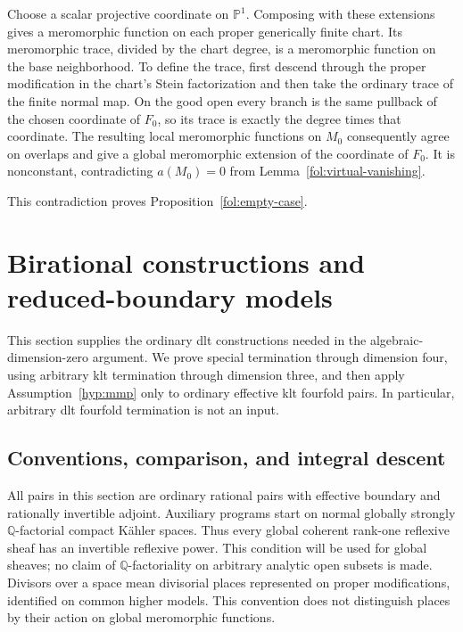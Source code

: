 \documentclass[11pt,letterpaper]{article}
\newcommand{\Q}{\mathbb{Q}}
\newcommand{\PP}{\mathbb{P}}
\theoremstyle{definition}
\theoremstyle{remark}
\begin{document}
Choose a scalar projective coordinate on $\PP^1$.  Composing with
these extensions gives a meromorphic function on each proper
generically finite chart.  Its meromorphic trace, divided by the
chart degree, is a meromorphic function on the base neighborhood.
To define the trace, first descend through the proper modification
in the chart's Stein factorization and then take the ordinary trace
of the finite normal map.  On the good open every branch is the
same pullback of the chosen coordinate of $F_0$, so its trace is
exactly the degree times that coordinate.  The resulting local
meromorphic functions on $M_0$ consequently agree on overlaps and
give a global meromorphic extension of the coordinate of $F_0$.
It is nonconstant, contradicting $a(M_0)=0$ from
Lemma~\ref{fol:virtual-vanishing}.

This contradiction proves Proposition~\ref{fol:empty-case}.

\section{Birational constructions and reduced-boundary models}
\label{bir:section}

This section supplies the ordinary dlt constructions needed in the
algebraic-dimension-zero argument.  We prove special termination through
dimension four, using arbitrary klt termination through dimension three,
and then apply Assumption~\ref{hyp:mmp} only to ordinary effective klt
fourfold pairs.  In particular, arbitrary dlt fourfold termination is not
an input.

\subsection{Conventions, comparison, and integral descent}
\label{bir:conventions}

All pairs in this section are ordinary rational pairs with effective
boundary and rationally invertible adjoint.  Auxiliary programs start
on normal globally strongly $\Q$-factorial compact K\"ahler spaces.
Thus every global coherent rank-one reflexive sheaf has an invertible
reflexive power.  This condition will be used for global sheaves; no
claim of $\Q$-factoriality on arbitrary analytic open subsets is made.
Divisors over a space mean divisorial places represented on proper
modifications, identified on common higher models.  This convention
does not distinguish places by their action on global meromorphic
functions.
\end{document}
